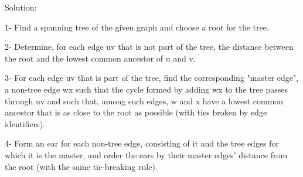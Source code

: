 Solution:

1- Find a spanning tree of the given graph and choose a root for the tree.

2- Determine, for each edge uv that is not part of the tree, the distance between the root and the lowest common ancestor of u and v.

3- For each edge uv that is part of the tree, find the corresponding "master edge", a non-tree edge wx such that the cycle formed by adding wx to the tree passes through uv and such that, among such edges, w and x have a lowest common ancestor that is as close to the root as possible (with ties broken by edge identifiers).

4- Form an ear for each non-tree edge, consisting of it and the tree edges for which it is the master, and order the ears by their master edges' distance from the root (with the same tie-breaking rule).
\hline
